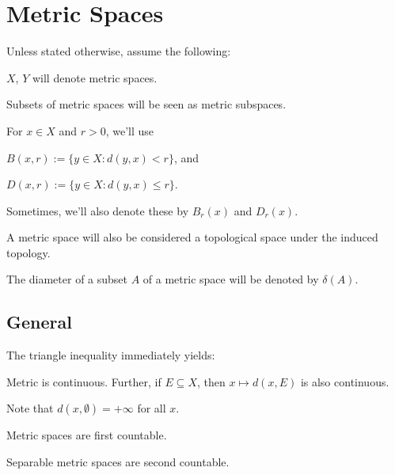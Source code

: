 %

\chapter{Metric Spaces}

\begin{conv}
	Unless stated otherwise, assume the following:
	\begin{assmplist}
		\item $X$, $Y$ will denote metric spaces.
		
		\item Subsets of metric spaces will be seen as metric subspaces.
		
		\item For $x\in X$ and $r > 0$, we'll use
		\begin{assmplist}
			\item $B(x, r) := \{y\in X : d(y, x) < r\}$, and
			\item $D(x, r) := \{y\in X : d(y, x)\le r\}$.
		\end{assmplist}
		Sometimes, we'll also denote these by $B_r(x)$ and $D_r(x)$.
		
		\item A metric space will also be considered a topological space under the induced topology.
		
		\item The diameter of a subset $A$ of a metric space will be denoted by $\delta(A)$.
	\end{assmplist}
\end{conv}

\section{General}
	
	The triangle inequality immediately yields:
	
	\begin{lem}
		Metric is continuous. Further, if $E\subseteq X$, then $x\mapsto d(x, E)$ is also continuous.
	\end{lem}
	
	\begin{rmk}
		Note that $d(x, \emptyset) = +\infty$ for all $x$.
	\end{rmk}
	
	
	\begin{lem}\label{LEM: separable metric spaces are second countable}
		\leavevmode
		\begin{mylist}
			\item Metric spaces are first countable.
			\item Separable metric spaces are second countable.
		\end{mylist}
	\end{lem}
	
